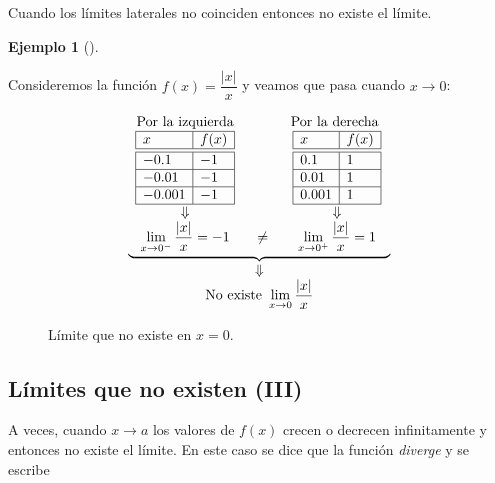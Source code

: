 \documentclass[
  a4paper,
]{scrreport}
\theoremstyle{definition}
\newtheorem{example}{Ejemplo}[chapter]
\theoremstyle{plain}
\theoremstyle{definition}
\theoremstyle{definition}
\theoremstyle{plain}
\theoremstyle{plain}
\theoremstyle{remark}
\begin{document}
Cuando los límites laterales no coinciden entonces no existe el límite.

\begin{example}[]\protect\hypertarget{exm-limites-no-existen-2}{}\label{exm-limites-no-existen-2}

Consideremos la función \(f(x)=\dfrac{\lvert x\rvert}{x}\) y veamos que
pasa cuando \(x\to 0\):

\[\begin{array}{c}
\underbrace{\begin{array}{ccc}
\mbox{Por la izquierda} & \qquad & \mbox{Por la derecha }\\
\begin{array}{|l|l|}
\hline
x      & f(x)   \\
\hline\hline
 -0.1   & -1       \\
\hline
 -0.01   & -1     \\
\hline
 -0.001  & -1   \\
\hline
\end{array}
& &
\begin{array}{|l|l|}
\hline
x      & f(x)   \\
\hline\hline
 0.1    & 1       \\
\hline
 0.01   & 1    \\
\hline
 0.001  & 1   \\
\hline
\end{array}\\
\Downarrow & & \Downarrow\\
\displaystyle \lim_{x\to 0^-}\frac{|x|}{x}=-1
&\neq &
\displaystyle \lim_{x\to 0^+}\frac{|x|}{x}=1
\end{array}}\\
\Downarrow\\
\displaystyle \mbox{No existe }\lim_{x\to 0}\frac{|x|}{x}
\end{array}
\]

\begin{figure}
\centering

\caption{Límite que no existe en \(x=0\).}
\end{figure}

\end{example}

\subsection{Límites que no existen
(III)}\label{luxedmites-que-no-existen-iii}

A veces, cuando \(x\to a\) los valores de \(f(x)\) crecen o decrecen
infinitamente y entonces no existe el límite. En este caso se dice que
la función \emph{diverge} y se escribe
\end{document}
